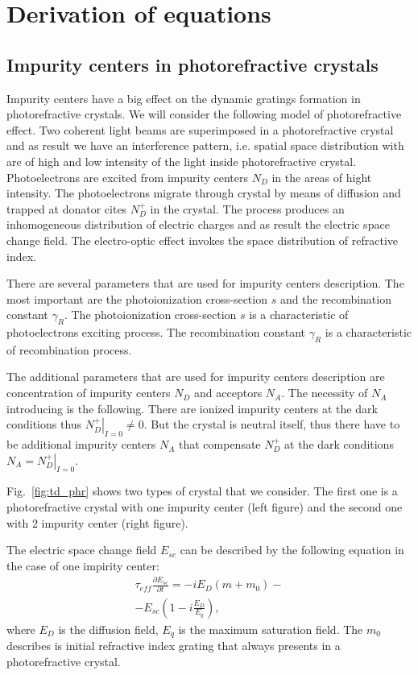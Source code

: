 \section{Derivation of equations}
\subsection{Impurity centers in photorefractive crystals}
Impurity centers have a big effect on the dynamic gratings formation in
photorefractive crystals. We will consider the following model of
photorefractive effect. Two coherent light beams are superimposed in a
photorefractive crystal and as result we have an interference pattern,
i.e. spatial space distribution with are of high and low intensity of
the light inside photorefractive crystal. Photoelectrons are excited
from  impurity centers $N_D$ 
in the areas of hight intensity. The photoelectrons migrate through
crystal by means of diffusion and trapped at donator cites $N_D^{+}$ in the
crystal. The process produces an inhomogeneous distribution of electric
charges and as result the electric space change field. The
electro-optic effect invokes the space distribution of refractive
index. 

There are several parameters that are used for impurity centers
description. The most important are the photoionization
cross-section $s$ and the recombination constant $\gamma_R$. The
photoionization 
cross-section $s$ is a characteristic of photoelectrons exciting
process. The recombination constant $\gamma_R$ is a characteristic of
recombination process.

The additional parameters that are used for impurity centers
description are concentration of impurity centers $N_D$ and acceptors
$N_A$. The necessity of $N_A$ introducing is the following. There are
ionized impurity centers at the dark conditions thus
\(\left.N_D^{+}\right|_{I=0} \ne 
0\). But the crystal is neutral itself, thus there have to be
additional impurity centers $N_A$ that compensate $N_D^{+}$ at the
dark conditions \(N_A = \left.N_D^{+}\right|_{I=0}\).

Fig.~\ref{fig:td_phr} shows two types
of crystal that we consider. The first one is a photorefractive
crystal with one impurity center (left figure) and the second one with
2 impurity center (right figure).



The electric space change field $E_{sc}$ can be described by the following
equation in the case of one impirity center:
\begin{eqnarray}
\label{eqEnd_1_phr}
\tau_{eff} \frac {\partial E_{sc}} {\partial t} =
- i E_D \left(m + m_0\right) 
- \nonumber \\ 
- E_{sc} 
\left( 1 - i \frac{E_D}{E_q}\right),
\end{eqnarray}
where $E_D$ is the diffusion field, $E_q$ is the maximum
saturation field.  The $m_0$ describes is initial refractive index grating that
always presents in a photorefractive crystal.

